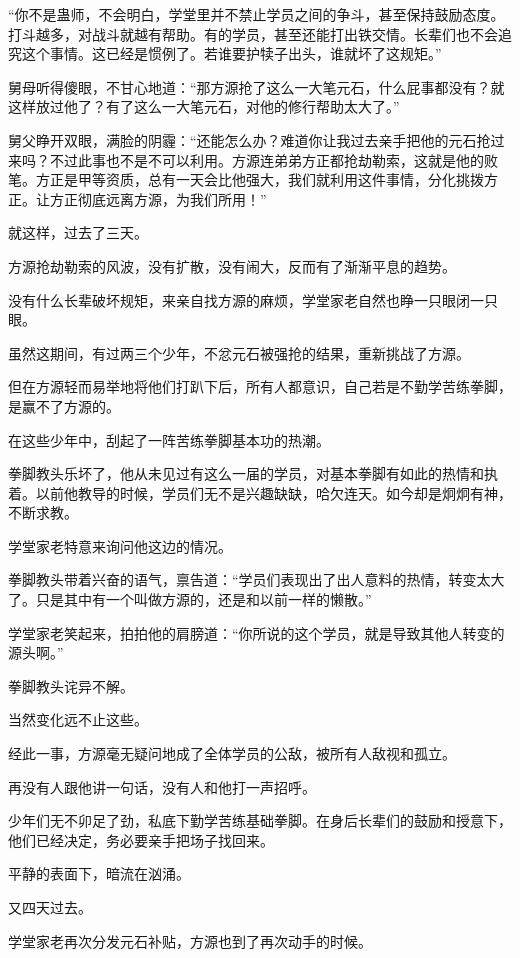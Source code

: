 \begin{this_body}
“你不是蛊师，不会明白，学堂里并不禁止学员之间的争斗，甚至保持鼓励态度。打斗越多，对战斗就越有帮助。有的学员，甚至还能打出铁交情。长辈们也不会追究这个事情。这已经是惯例了。若谁要护犊子出头，谁就坏了这规矩。”

舅母听得傻眼，不甘心地道：“那方源抢了这么一大笔元石，什么屁事都没有？就这样放过他了？有了这么一大笔元石，对他的修行帮助太大了。”

舅父睁开双眼，满脸的阴霾：“还能怎么办？难道你让我过去亲手把他的元石抢过来吗？不过此事也不是不可以利用。方源连弟弟方正都抢劫勒索，这就是他的败笔。方正是甲等资质，总有一天会比他强大，我们就利用这件事情，分化挑拨方正。让方正彻底远离方源，为我们所用！”

就这样，过去了三天。

方源抢劫勒索的风波，没有扩散，没有闹大，反而有了渐渐平息的趋势。

没有什么长辈破坏规矩，来亲自找方源的麻烦，学堂家老自然也睁一只眼闭一只眼。

虽然这期间，有过两三个少年，不忿元石被强抢的结果，重新挑战了方源。

但在方源轻而易举地将他们打趴下后，所有人都意识，自己若是不勤学苦练拳脚，是赢不了方源的。

在这些少年中，刮起了一阵苦练拳脚基本功的热潮。

拳脚教头乐坏了，他从未见过有这么一届的学员，对基本拳脚有如此的热情和执着。以前他教导的时候，学员们无不是兴趣缺缺，哈欠连天。如今却是炯炯有神，不断求教。

学堂家老特意来询问他这边的情况。

拳脚教头带着兴奋的语气，禀告道：“学员们表现出了出人意料的热情，转变太大了。只是其中有一个叫做方源的，还是和以前一样的懒散。”

学堂家老笑起来，拍拍他的肩膀道：“你所说的这个学员，就是导致其他人转变的源头啊。”

拳脚教头诧异不解。

当然变化远不止这些。

经此一事，方源毫无疑问地成了全体学员的公敌，被所有人敌视和孤立。

再没有人跟他讲一句话，没有人和他打一声招呼。

少年们无不卯足了劲，私底下勤学苦练基础拳脚。在身后长辈们的鼓励和授意下，他们已经决定，务必要亲手把场子找回来。

平静的表面下，暗流在汹涌。

又四天过去。

学堂家老再次分发元石补贴，方源也到了再次动手的时候。


\end{this_body}

